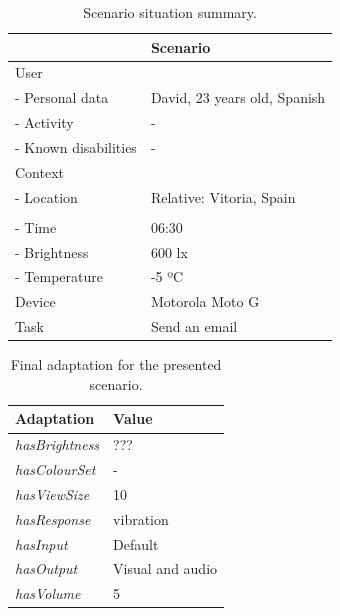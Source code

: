 \begin{table}
 \caption{Scenario situation summary.}
 \label{tbl:polisher_scenario}
 \footnotesize
 \centering
\begin{tabular}{l l}
  \hline 
				& \textbf{Scenario}		\\
  \hline
  User \\
  \qquad - Personal data 	& David, 23 years old, Spanish 	\\
  \qquad - Activity	 	& - 				\\
  \qquad - Known disabilities 	& - 				\\
  Context \\
  \qquad - Location 		& Relative: Vitoria, Spain  	\\
				& 				\\
  \qquad - Time			& 06:30 			\\
  \qquad - Brightness		& 600 \ac{lx} 			\\
  \qquad - Temperature		& -5 ºC 			\\
  Device 			& Motorola Moto G 	 	\\
  \hline
  Task				& Send an email			\\
  \hline
\end{tabular}
\end{table}

\begin{table}
 \caption{Final adaptation for the presented scenario.}
 \label{tbl:polisher_adaptation}
 \footnotesize
 \centering
\begin{tabular}{l l}
  \hline 
    \textbf{Adaptation} 	& \textbf{Value}\\
    \hline
    \textit{hasBrightness}	& ???		\\
    \textit{hasColourSet}	& -		\\
    \textit{hasViewSize}	& 10		\\
    \textit{hasResponse}	& vibration	\\
    \textit{hasInput}		& Default	\\
    \textit{hasOutput}		& Visual and audio\\
    \textit{hasVolume}		& 5 		\\
  \hline
\end{tabular}
\end{table}


